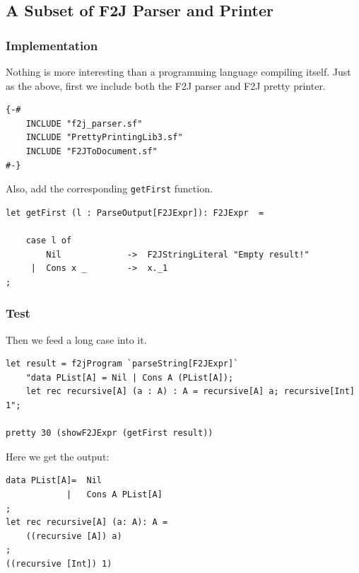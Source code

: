 \subsection{A Subset of F2J Parser and Printer}

\subsubsection{Implementation}
Nothing is more interesting than a programming language compiling itself. Just as the above, first we include both the F2J parser and F2J pretty printer.
\begin{lstlisting}
{-#
    INCLUDE "f2j_parser.sf"
    INCLUDE "PrettyPrintingLib3.sf"
    INCLUDE "F2JToDocument.sf"
#-}
\end{lstlisting}

Also, add the corresponding \texttt{getFirst} function.
\begin{lstlisting}
let getFirst (l : ParseOutput[F2JExpr]): F2JExpr  =

    case l of
        Nil             ->  F2JStringLiteral "Empty result!"
     |  Cons x _        ->  x._1
;
\end{lstlisting}

\subsubsection{Test}
Then we feed a long case into it.
\begin{lstlisting}
let result = f2jProgram `parseString[F2JExpr]`
    "data PList[A] = Nil | Cons A (PList[A]);
    let rec recursive[A] (a : A) : A = recursive[A] a; recursive[Int] 1";

pretty 30 (showF2JExpr (getFirst result))
\end{lstlisting}

Here we get the output:
\begin{lstlisting}
data PList[A]= 	Nil
            |	Cons A PList[A]
;
let rec recursive[A] (a: A): A =
    ((recursive [A]) a)
;
((recursive [Int]) 1)
\end{lstlisting}



